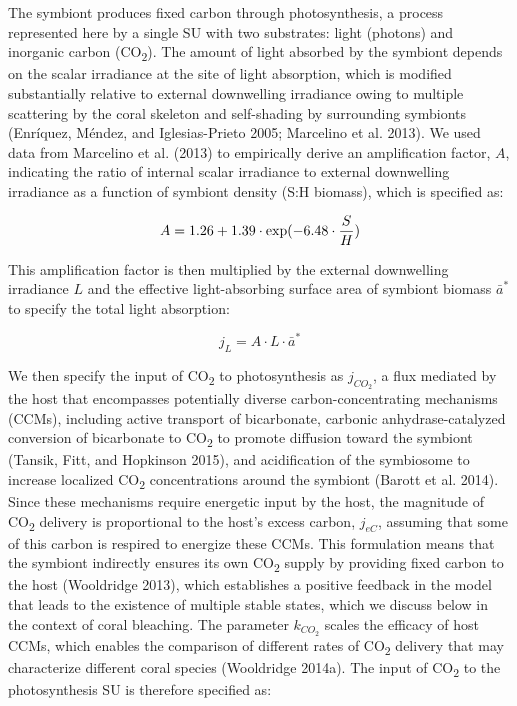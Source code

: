 \documentclass[]{elsarticle} %
\begin{document}
The symbiont produces fixed carbon through photosynthesis, a process
represented here by a single SU with two substrates: light (photons) and
inorganic carbon (CO\textsubscript{2}). The amount of light absorbed by
the symbiont depends on the scalar irradiance at the site of light
absorption, which is modified substantially relative to external
downwelling irradiance owing to multiple scattering by the coral
skeleton and self-shading by surrounding symbionts (Enríquez, Méndez,
and Iglesias-Prieto 2005; Marcelino et al. 2013). We used data from
Marcelino et al. (2013) to empirically derive an amplification factor,
\(A\), indicating the ratio of internal scalar irradiance to external
downwelling irradiance as a function of symbiont density (S:H biomass),
which is specified as:

\begin{equation} A = 1.26 + 1.39 \cdot \exp(-6.48 \cdot {S \over H}) \end{equation}

This amplification factor is then multiplied by the external downwelling
irradiance \(L\) and the effective light-absorbing surface area of
symbiont biomass \(\bar{a}^*\) to specify the total light absorption:

\begin{equation} j_L =  A \cdot L \cdot \bar{a}^* \end{equation}

We then specify the input of CO\textsubscript{2} to photosynthesis as
\(j_{CO_2}\), a flux mediated by the host that encompasses potentially
diverse carbon-concentrating mechanisms (CCMs), including active
transport of bicarbonate, carbonic anhydrase-catalyzed conversion of
bicarbonate to CO\textsubscript{2} to promote diffusion toward the
symbiont (Tansik, Fitt, and Hopkinson 2015), and acidification of the
symbiosome to increase localized CO\textsubscript{2} concentrations
around the symbiont (Barott et al. 2014). Since these mechanisms require
energetic input by the host, the magnitude of CO\textsubscript{2}
delivery is proportional to the host's excess carbon, \(j_{eC}\),
assuming that some of this carbon is respired to energize these CCMs.
This formulation means that the symbiont indirectly ensures its own
CO\textsubscript{2} supply by providing fixed carbon to the host
(Wooldridge 2013), which establishes a positive feedback in the model
that leads to the existence of multiple stable states, which we discuss
below in the context of coral bleaching. The parameter \(k_{CO_2}\)
scales the efficacy of host CCMs, which enables the comparison of
different rates of CO\textsubscript{2} delivery that may characterize
different coral species (Wooldridge 2014a). The input of
CO\textsubscript{2} to the photosynthesis SU is therefore specified as:
\end{document}
